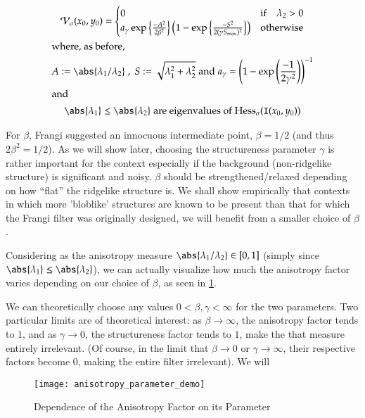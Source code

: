 \begin{gather} \label{eq:frangi-vesselness-measure-v1}
\Vsigma(x_0,y_0) = \begin{cases}
0 & \text{if} \quad \lambda_2 > 0 \\
a_\gamma \exp\left\{\frac{-A^2}{2\beta^2}\right\}
\left(1 - \exp\left\{\frac{-S^2}{2(\gamma S_{\max})^2}\right\}\right) & \text{otherwise}
\end{cases} \\
\shortintertext{where, as before,}
A := \abs{\lambda_1 / \lambda_2}
\;,\;
S := \sqrt{\lambda_1^2 + \lambda_2^2}
\;\textrm{and}\;
a_\gamma = \left(1-\exp\left(\frac{-1}{2\gamma^2}\right)\right)^{-1} \notag\\
\shortintertext{and}
\abs{\lambda_1} \le \abs{\lambda_2}
\; \textrm{are eigenvalues of}\; \Hess_\sigma(\img(x_0, y_0)) \notag
\end{gather}

For $\beta$, Frangi suggested an innocuous intermediate point, $\beta=1/2$ (and thus $2\beta^2 = 1/2$).
As we will show later, choosing the structureness parameter $\gamma$ is rather important for the context especially if the background (non-ridgelike structure) is significant and noisy. $\beta$ should be strengthened/relaxed depending on how ``flat'' the ridgelike structure is. We shall show empirically that contexts in which more 'bloblike' structures are known to be present than that for which the Frangi filter was originally designed, we will benefit from a smaller choice of $\beta$.

Considering as the anisotropy measure $\abs{\lambda_1 / \lambda_2} \in [0,1]$ (simply since $\abs{\lambda_1} \le \abs{\lambda_2}$), we can actually visualize how much the 
anisotropy factor varies depending on our choice of $\beta$, as seen in \cref{fig:anisotropy-parameter-demo}.

We can theoretically choose any values $0 < \beta, \gamma < \infty$ for the two parameters. Two particular limits are of theoretical interest:
as $\beta \to \infty$, the anisotropy factor tends to $1$, and as $\gamma \to 0$, the structureness factor tends to $1$, make the that measure entirely irrelevant. (Of course, in the limit that $\beta \to 0$ or $\gamma \to \infty$, their respective factors become 0, making the entire filter irrelevant). We will 
\begin{figure}
  \texttt{[image: anisotropy\_parameter\_demo]}
  \caption{Dependence of the Anisotropy Factor on its Parameter}
  \label{fig:anisotropy-parameter-demo}
\end{figure}

